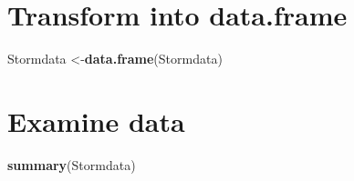 \documentclass[]{article}
\newenvironment{Shaded}{\begin{snugshade}}{\end{snugshade}}
\newcommand{\KeywordTok}[1]{\textcolor[rgb]{0.13,0.29,0.53}{\textbf{#1}}}
\newcommand{\NormalTok}[1]{#1}
\begin{document}
\hypertarget{transform-into-data.frame}{%
\section{Transform into data.frame}\label{transform-into-data.frame}}

\begin{Shaded}
\begin{Highlighting}[]
\NormalTok{Stormdata <-}\KeywordTok{data.frame}\NormalTok{(Stormdata)}
\end{Highlighting}
\end{Shaded}

\hypertarget{examine-data}{%
\section{Examine data}\label{examine-data}}

\begin{Shaded}
\begin{Highlighting}[]
\KeywordTok{summary}\NormalTok{(Stormdata)}
\end{Highlighting}
\end{Shaded}
\end{document}
